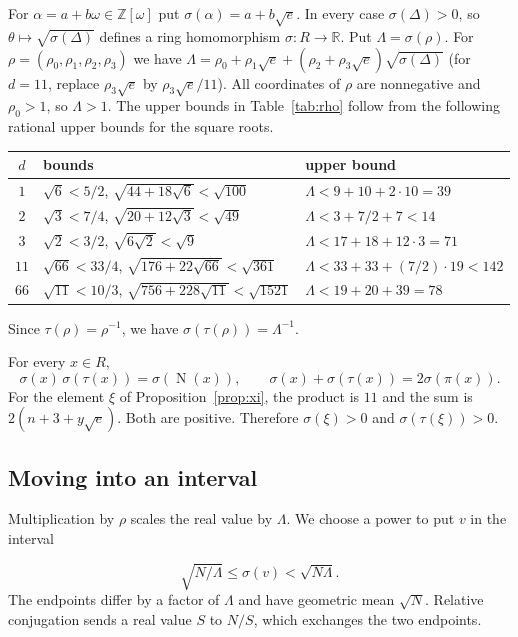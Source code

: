 \documentclass[a4paper,11pt]{article}
\theoremstyle{plain}
\theoremstyle{definition}
\theoremstyle{remark}
\numberwithin{equation}{section}
\numberwithin{table}{section}
\newcommand{\Z}{\mathbb{Z}}
\newcommand{\Rr}{\mathbb{R}}
\newcommand{\Nm}{\operatorname{N}}
\begin{document}
For $\alpha=a+b\omega\in\Z[\omega]$ put $\sigma(\alpha)=a+b\sqrt e$.
In every case $\sigma(\Delta)>0$, so $\theta\mapsto\sqrt{\sigma(\Delta)}$ defines a ring homomorphism $\sigma:R\to\Rr$.
Put $\Lambda=\sigma(\rho)$. For $\rho=(\rho_0,\rho_1,\rho_2,\rho_3)$ we have $\Lambda=\rho_0+\rho_1\sqrt e+(\rho_2+\rho_3\sqrt e)\sqrt{\sigma(\Delta)}$ (for $d=11$, replace $\rho_3\sqrt e$ by $\rho_3\sqrt e/11$).
All coordinates of $\rho$ are nonnegative and $\rho_0>1$, so $\Lambda>1$.
The upper bounds in Table~\ref{tab:rho} follow from the following rational upper bounds for the square roots.
\begin{center}
\small
\begin{tabular}{cll}
\toprule
$d$ & bounds & upper bound\\
\midrule
$1$ & $\sqrt6<5/2$, $\sqrt{44+18\sqrt6}<\sqrt{100}$ & $\Lambda<9+10+2\cdot10=39$\\
$2$ & $\sqrt3<7/4$, $\sqrt{20+12\sqrt3}<\sqrt{49}$ & $\Lambda<3+7/2+7<14$\\
$3$ & $\sqrt2<3/2$, $\sqrt{6\sqrt2}<\sqrt9$ & $\Lambda<17+18+12\cdot3=71$\\
$11$ & $\sqrt{66}<33/4$, $\sqrt{176+22\sqrt{66}}<\sqrt{361}$ & $\Lambda<33+33+(7/2)\cdot19<142$\\
$66$ & $\sqrt{11}<10/3$, $\sqrt{756+228\sqrt{11}}<\sqrt{1521}$ & $\Lambda<19+20+39=78$\\
\bottomrule
\end{tabular}
\end{center}
Since $\tau(\rho)=\rho^{-1}$, we have $\sigma(\tau(\rho))=\Lambda^{-1}$.

For every $x\in R$,
\[
\sigma(x)\,\sigma(\tau(x))=\sigma(\Nm(x)),\qquad\sigma(x)+\sigma(\tau(x))=2\sigma(\pi(x)).
\]
For the element $\xi$ of Proposition~\ref{prop:xi}, the product is $11$ and the sum is $2(n+3+y\sqrt e)$. Both are positive.
Therefore $\sigma(\xi)>0$ and $\sigma(\tau(\xi))>0$.

\subsection{Moving into an interval}

Multiplication by $\rho$ scales the real value by $\Lambda$. We choose a power to put $v$ in the interval

\[
\sqrt{N/\Lambda}\le\sigma(v)<\sqrt{N\Lambda}.
\]
The endpoints differ by a factor of $\Lambda$ and have geometric mean $\sqrt N$. Relative conjugation sends a real value $S$ to $N/S$, which exchanges the two endpoints.
\end{document}
